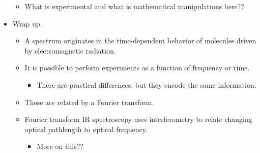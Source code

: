 \documentclass[../notes.tex]{subfiles}
\begin{document}
\begin{itemize}
\begin{itemize}
        \item What is experimental and what is mathematical manipulations here??
    \end{itemize}
    \item Wrap up.
    \begin{itemize}
        \item A spectrum originates in the time-dependent behavior of molecules driven by electromagnetic radiation.
        \item It is possible to perform experiments as a function of frequency or time.
        \begin{itemize}
            \item There are practical differences, but they encode the same information.
        \end{itemize}
        \item These are related by a Fourier transform.
        \item Fourier transform IR spectroscopy uses interferometry to relate changing optical pathlength to optical frequency.
        \begin{itemize}
            \item More on this??
        \end{itemize}
    \end{itemize}
\end{itemize}
\end{document}
